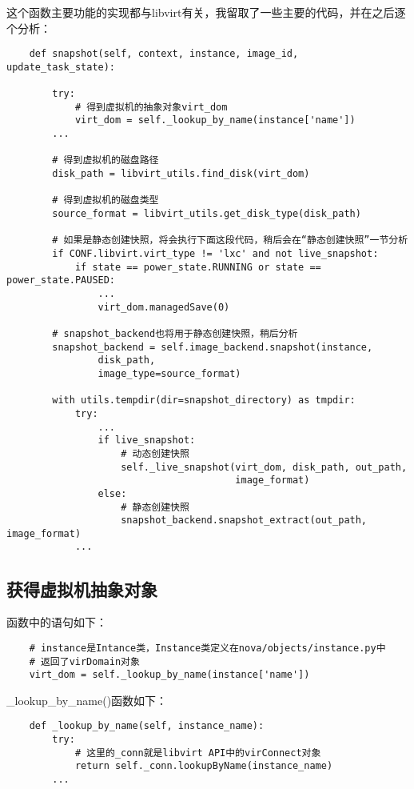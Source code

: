 \documentclass[a4paper,left=1.5cm,right=1.5cm,11pt]{article}
\begin{document}
	这个函数主要功能的实现都与libvirt有关，我留取了一些主要的代码，并在之后逐个分析：
	\begin{lstlisting}
	def snapshot(self, context, instance, image_id, update_task_state):

        try:
			# 得到虚拟机的抽象对象virt_dom
            virt_dom = self._lookup_by_name(instance['name'])
        ...

		# 得到虚拟机的磁盘路径
        disk_path = libvirt_utils.find_disk(virt_dom)

		# 得到虚拟机的磁盘类型
        source_format = libvirt_utils.get_disk_type(disk_path)

		# 如果是静态创建快照，将会执行下面这段代码，稍后会在“静态创建快照”一节分析
		if CONF.libvirt.virt_type != 'lxc' and not live_snapshot:
            if state == power_state.RUNNING or state == power_state.PAUSED:
                ...
                virt_dom.managedSave(0)

		# snapshot_backend也将用于静态创建快照，稍后分析
        snapshot_backend = self.image_backend.snapshot(instance,
                disk_path,
                image_type=source_format)

        with utils.tempdir(dir=snapshot_directory) as tmpdir:
            try:
				...
                if live_snapshot:
					# 动态创建快照
                    self._live_snapshot(virt_dom, disk_path, out_path,
                                        image_format)
                else:
					# 静态创建快照
                    snapshot_backend.snapshot_extract(out_path, image_format)
            ...
	\end{lstlisting}

\clearpage

\subsection{获得虚拟机抽象对象}
	函数中的语句如下：
	\begin{lstlisting}
	# instance是Intance类，Instance类定义在nova/objects/instance.py中
	# 返回了virDomain对象
	virt_dom = self._lookup_by_name(instance['name'])
	\end{lstlisting}

	\_lookup\_by\_name()函数如下：
	\begin{lstlisting}
	def _lookup_by_name(self, instance_name):
        try:
			# 这里的_conn就是libvirt API中的virConnect对象
            return self._conn.lookupByName(instance_name)
        ...
	\end{lstlisting}
\end{document}
